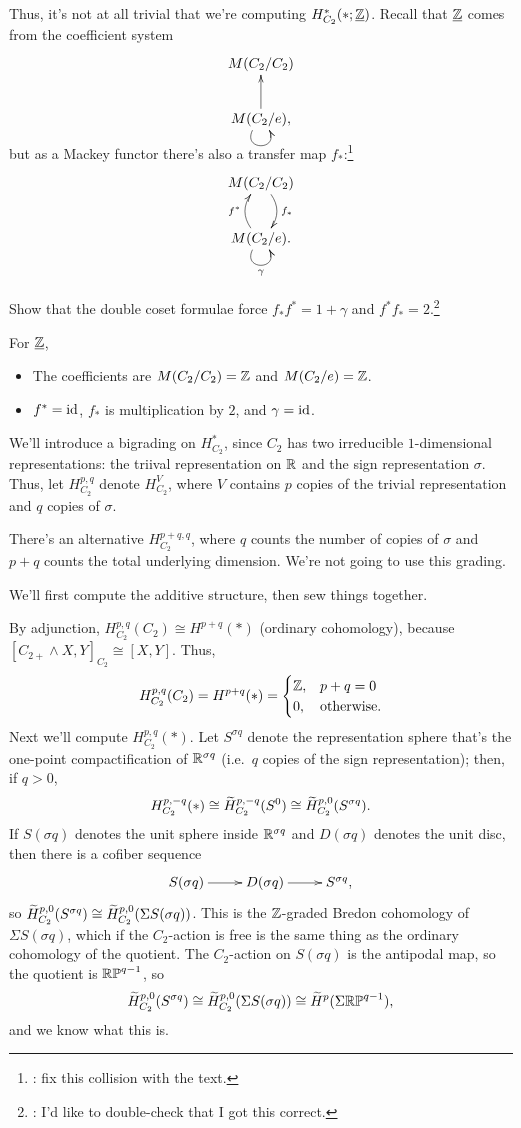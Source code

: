 Thus, it's not at all trivial that we're computing $H_{C_2}^*(*;\underline{\mathbb Z})$. Recall that $\underline{\mathbb Z}$ comes
from the coefficient system
\[\xymatrix{
	M(C_2/C_2)\\
	M(C_2/e),\ar[u]\ar@(dl,dr)
}\]
but as a Mackey functor there's also a transfer map $f_*$:\footnote{\TODO: fix this \Xy{} collision with the text.}
\[\xymatrix{
	M(C_2/C_2)\ar@/^0.4cm/[d]^{f_*}\\
	M(C_2/e).\ar@/^0.4cm/[u]^{f^*}\ar@(dl,dr)_\gamma
}\]
\begin{ex}
Show that the double coset formulae force $f_*f^* = 1+\gamma$ and $f^*f_* = 2$.\footnote{\TODO: I'd like to
double-check that I got this correct.}
\end{ex}
For $\underline{\mathbb Z}$,
\begin{itemize}
	\item The coefficients are $M(C_2/C_2) = \mathbb Z$ and $M(C_2/e) = \mathbb Z$.
	\item $f^* = \mathrm{id}$, $f_*$ is multiplication by $2$, and $\gamma = \mathrm{id}$.
\end{itemize}
We'll introduce a bigrading on $H^*_{C_2}$, since $C_2$ has two irreducible $1$-dimensional representations: the
triival representation on $\mathbb R$ and the sign representation $\sigma$. Thus, let $H_{C_2}^{p,q}$ denote $H_{C_2}^V$,
where $V$ contains $p$ copies of the trivial representation and $q$ copies of $\sigma$.
\begin{rem}
There's an alternative  $H_{C_2}^{p+q,q}$, where $q$ counts the number of copies of $\sigma$
and $p+q$ counts the total underlying dimension. We're not going to use this grading.
\end{rem}
We'll first compute the additive structure, then sew things together.

By adjunction, $H_{C_2}^{p,q}(C_2)\cong H^{p+q}(*)$ (ordinary cohomology), because $[C_{2+}\wedge X, Y]_{C_2}\cong
[X,Y]$. Thus,
\[H_{C_2}^{p,q}(C_2) = H^{p+q}(*) = \begin{cases}
	\mathbb Z, &p+q=0\\
	0, &\text{otherwise.}
\end{cases}\]
Next we'll compute $H_{C_2}^{p,q}(*)$. Let $S^{\sigma q}$ denote the representation sphere that's the one-point
compactification of $\mathbb R^{\sigma q}$ (i.e.\ $q$ copies of the sign representation); then, if $q > 0$,
\[H_{C_2}^{p,-q}(*)\cong \widetilde H_{C_2}^{p,-q}(S^0)\cong \widetilde H_{C_2}^{p,0}(S^{\sigma q}).\]
If $S(\sigma q)$ denotes the unit sphere inside $\mathbb R^{\sigma q}$ and $D(\sigma q)$ denotes the unit disc, then there
is a cofiber sequence
\begin{equation}
\label{signed_cofiber}
\xymatrix{
	S(\sigma q)\ar[r] & D(\sigma q)\ar[r] & S^{\sigma q},
}
\end{equation}
so $\widetilde H_{C_2}^{p,0}(S^{\sigma q})\cong\widetilde H_{C_2}^{p,0}(\Sigma S(\sigma q))$. This is the $\mathbb Z$-graded Bredon
cohomology of $\Sigma S(\sigma q)$, which if the $C_2$-action is free is the same thing as the ordinary cohomology
of the quotient. The $C_2$-action on $S(\sigma q)$ is the antipodal map, so the quotient is $\mathbb{RP}^{q-1}$, so
\[\widetilde H_{C_2}^{p,0}(S^{\sigma q})\cong \widetilde H_{C_2}^{p,0}(\Sigma S(\sigma q))\cong \widetilde H^p(\Sigma\mathbb{RP}^{q-1}),\]
and we know what this is.

